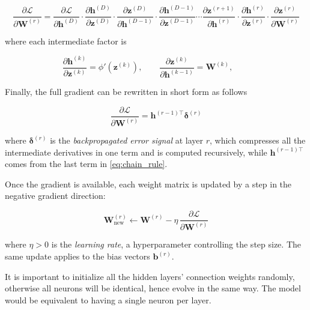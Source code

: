 \begin{equation}
    \frac{\partial \mathcal{L}}{\partial \mathbf{W}^{(r)}} =
    \frac{\partial \mathcal{L}}{\partial \mathbf{h}^{(D)}} \cdot
    \frac{\partial \mathbf{h}^{(D)}}{\partial \mathbf{z}^{(D)}} \cdot
    \frac{\partial \mathbf{z}^{(D)}}{\partial \mathbf{h}^{(D-1)}} \cdot
    \frac{\partial \mathbf{h}^{(D-1)}}{\partial \mathbf{z}^{(D-1)}} \cdots
    \frac{\partial \mathbf{z}^{(r+1)}}{\partial \mathbf{h}^{(r)}} \cdot
    \frac{\partial \mathbf{h}^{(r)}}{\partial \mathbf{z}^{(r)}} \cdot
    \frac{\partial \mathbf{z}^{(r)}}{\partial \mathbf{W}^{(r)}}
      \label{eq:chain_rule}
\end{equation}

where each intermediate factor is

\begin{equation}
    \frac{\partial \mathbf{h}^{(k)}}{\partial \mathbf{z}^{(k)}} = \phi'\!\left(\mathbf{z}^{(k)}\right), \qquad
    \frac{\partial \mathbf{z}^{(k)}}{\partial \mathbf{h}^{(k-1)}} = \mathbf{W}^{(k)}, \qquad
\end{equation}

Finally, the full gradient can be rewritten in short form as follows

\begin{equation}
    \frac{\partial \mathcal{L}}{\partial \mathbf{W}^{(r)}} = \mathbf{h}^{(r-1)\top} \boldsymbol{\delta}^{(r)}
\end{equation}

where $\boldsymbol{\delta}^{(r)}$ is the \textit{backpropagated error signal} at layer $r$, which compresses all the intermediate derivatives in one term and is computed recursively, while $\mathbf{h}^{(r-1)\top}$ comes from the last term in \eqref{eq:chain_rule}.

Once the gradient is available, each weight matrix is updated by a step in the negative gradient direction:

\begin{equation}
    \mathbf{W}^{(r)}_{\text{new}} \leftarrow \mathbf{W}^{(r)} - \eta \, \frac{\partial \mathcal{L}}{\partial \mathbf{W}^{(r)}}
    \label{eq:gd_update}
\end{equation}

where $\eta > 0$ is the \textit{learning rate}, a hyperparameter controlling the step size. The same update applies to the bias vectors $\mathbf{b}^{(r)}$.

It is important to initialize all the hidden layers' connection weights randomly, otherwise all neurons will be identical, hence evolve in the same way. The model would be equivalent to having a single neuron per layer.


